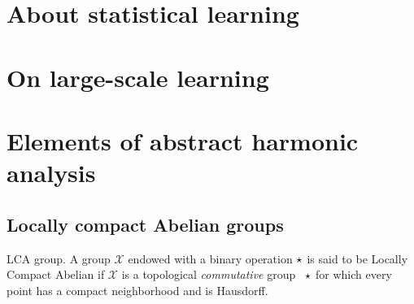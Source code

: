 \section{About statistical learning}
\label{sec:about_statistical_learning}

\section{On large-scale learning}
\label{sec:on_large-scale_learning}

\section{Elements of abstract harmonic analysis}
\label{sec:abstract_harmonic}

\subsection{Locally compact Abelian groups}
\begin{definition}{\acl{LCA} group.}
A group $\mathcal{X}$ endowed with a binary operation $\star$ is said to be Locally Compact Abelian if $\mathcal{X}$ is a topological \emph{commutative} group \wrt~$\star$ for which every point has a compact neighborhood and is Hausdorff. 
\end{definition}

